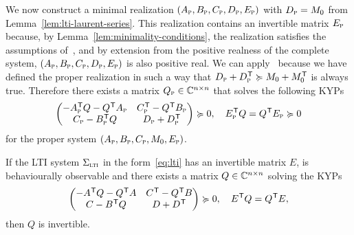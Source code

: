 We now construct a minimal realization $(A_{\textnormal{\scshape p}}, B_{\textnormal{\scshape p}}, C_{\textnormal{\scshape p}}, D_{\textnormal{\scshape p}}, E_{\textnormal{\scshape p}})$ with $D_{\textnormal{\scshape p}} = M_0$ from Lemma~\ref{lem:lti-laurent-series}.
This realization contains an invertible matrix $E_{\textnormal{\scshape p}}$ because, by Lemma~\ref{lem:minimality-conditions}, the realization satisfies the assumptions of~\cite[Theorem~6.3]{Freund2004}, and by extension from the positive realness of the complete system, $(A_{\textnormal{\scshape p}}, B_{\textnormal{\scshape p}}, C_{\textnormal{\scshape p}}, D_{\textnormal{\scshape p}}, E_{\textnormal{\scshape p}})$ is also positive real.
We can apply~\cite[Proposition~5.4]{CGH2022} because we have defined the proper realization in such a way that $D_{\textnormal{\scshape p}} + D_{\textnormal{\scshape p}}^{\mkern1mu \mathsf{T}} \succcurlyeq M_0 + M_0^{\mkern1mu \mathsf{T}}$ is always true.
Therefore there exists a matrix $Q_{\textnormal{\scshape p}} \in \mathbb{C}^{n \times n}$ that solves the following \acp{KYP}
\begin{equation}\label{eq:kyp-lmi}
    \begin{pmatrix}
        -A_{\textnormal{\scshape p}}^{\mkern1mu \mathsf{T}} Q - Q^{\mkern1mu \mathsf{T}} A_{\textnormal{\scshape p}} & C_{\textnormal{\scshape p}}^{\mkern1mu \mathsf{T}} - Q^{\mkern1mu \mathsf{T}} B_{\textnormal{\scshape p}} \\
        C_{\textnormal{\scshape p}} - B_{\textnormal{\scshape p}}^{\mkern1mu \mathsf{T}} Q & D_{\textnormal{\scshape p}} + D_{\textnormal{\scshape p}}^{\mkern1mu \mathsf{T}}
    \end{pmatrix} \succcurlyeq 0,\quad E_{\textnormal{\scshape p}}^{\mkern1mu \mathsf{T}} Q = Q^{\mkern1mu \mathsf{T}} E_{\textnormal{\scshape p}} \succcurlyeq 0
\end{equation}
for the proper system $(A_{\textnormal{\scshape p}}, B_{\textnormal{\scshape p}}, C_{\textnormal{\scshape p}}, M_0, E_{\textnormal{\scshape p}})$.

\begin{lemma}\label{lem:kyp-invertible-solution}
    If the \ac{LTI} system $\Sigma_{\textnormal{\scshape lti}}$ in the form~\eqref{eq:lti} has an invertible matrix $E$, is behaviourally observable and there exists a matrix $Q \in \mathbb{C}^{n \times n}$ solving the \acp{KYP}
    \begin{equation*}
        \begin{pmatrix}
            -A^{\mkern1mu \mathsf{T}} Q - Q^{\mkern1mu \mathsf{T}} A & C^{\mkern1mu \mathsf{T}} - Q^{\mkern1mu \mathsf{T}} B \\
            C - B^{\mkern1mu \mathsf{T}} Q & D + D^{\mkern1mu \mathsf{T}}
        \end{pmatrix} \succcurlyeq 0,\quad E^{\mkern1mu \mathsf{T}} Q = Q^{\mkern1mu \mathsf{T}} E,
    \end{equation*}
    then $Q$ is invertible.
\end{lemma}

